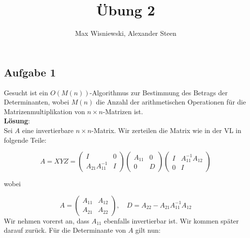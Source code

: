 \documentclass[11pt,a4paper,ngerman]{article}
\date{}
\title{Übung 2}
\author{Max Wisniewski, Alexander Steen}
\begin{document}

\renewcommand{\figurename}{Figure}

\maketitle
\thispagestyle{fancy}

\subsection*{Aufgabe 1}
Gesucht ist ein $O(M(n))$-Algorithmus zur Bestimmung des Betrags der Determinanten, wobei $M(n)$ die Anzahl
der arithmetischen Operationen für die Matrizenmultiplikation von $n \times n$-Matrizen ist. \\

\textbf{Lösung}: \\
Sei $A$ eine invertierbare $n \times n$-Matrix. Wir zerteilen die Matrix wie in der VL in folgende Teile:

\begin{equation*}
A = XYZ = \left( \begin{array}{cc}
          I & 0 \\
          A_{21}A_{11}^{-1} & I
          \end{array} \right)
          \left( \begin{array}{cc}
          A_{11} & 0 \\
          0 & D
          \end{array} \right)
          \left( \begin{array}{cc}
          I & A_{11}^{-1}A_{12} \\
          0 & I
          \end{array} \right)
\end{equation*}

wobei

\begin{equation*}
A = \left( \begin{array}{cc}
          A_{11} & A_{12} \\
          A_{21} & A_{22}
    \end{array} \right), \quad
D = A_{22} - A_{21}A_{11}^{-1}A_{12}
\end{equation*}
Wir nehmen vorerst an, dass $A_{11}$ ebenfalls invertierbar ist. Wir kommen später darauf zurück.
Für die Determinante von $A$ gilt nun:
\end{document}

